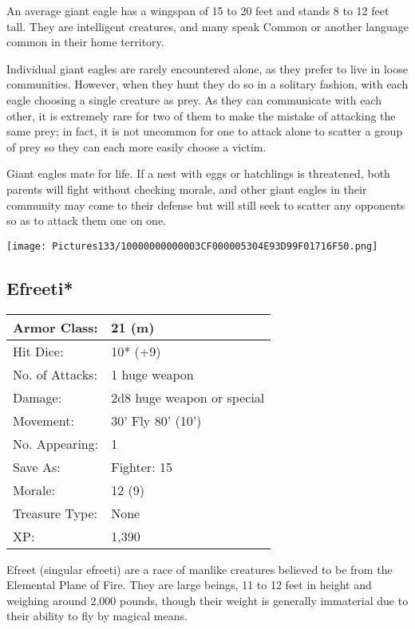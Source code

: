 \documentclass[a4paper,twoside,openany,10pt]{book}
\begin{document}
\begin{multicols}{2}
An average giant eagle has a wingspan of 15 to 20 feet and stands 8 to 12 feet tall. They are intelligent creatures, and many speak Common or another language common in their home territory.

Individual giant eagles are rarely encountered alone, as they prefer to live in loose communities. However, when they hunt they do so in a solitary fashion, with each eagle choosing a single creature as prey. As they can communicate with each other, it is extremely rare for two of them to make the mistake of attacking the same prey; in fact, it is not uncommon for one to attack alone to scatter a group of prey so they can each more easily choose a victim.

Giant eagles mate for life. If a nest with eggs or hatchlings is threatened, both parents will fight without checking morale, and other giant eagles in their community may come to their defense but will still seek to scatter any opponents so as to attack them one on one.

\begin{center}
	\texttt{[image: Pictures133/10000000000003CF000005304E93D99F01716F50.png]}
\end{center}

\subsection*{Efreeti*}\label{efreeti}

\begin{tabularx}{0.48\textwidth}{@{}lX@{}}
Armor Class: & 21 (m) \\\hline
Hit Dice: & 10* (+9) \\\hline
No. of Attacks: & 1 huge weapon \\\hline
Damage: & 2d8 huge weapon or special \\\hline
Movement: & 30' Fly 80'
(10') \\\hline
No. Appearing: & 1 \\\hline
Save As: & Fighter: 15 \\\hline
Morale: & 12 (9) \\\hline
Treasure Type: & None \\\hline
XP: & 1,390 \\\hline
\end{tabularx}\medskip

Efreet (singular efreeti) are a race of manlike creatures believed to be from the Elemental Plane of Fire. They are large beings, 11 to 12 feet in height and weighing around 2,000 pounds, though their weight is generally immaterial due to their ability to fly by magical means.


\end{multicols}
\end{document}
